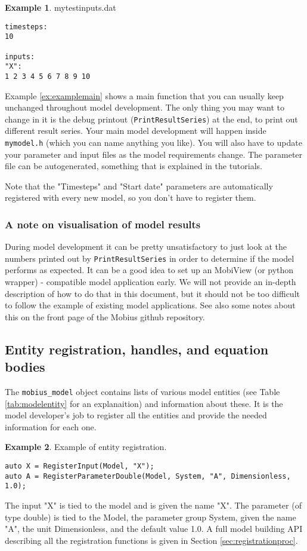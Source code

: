 \documentclass[11pt]{article}
\theoremstyle{definition}
\newtheorem{myexample}{Example}
\newenvironment{example}%
  {\begin{lrbox}{\examplebox}%
   \begin{minipage}{\dimexpr\linewidth-2\fboxsep}
   \begin{myexample}}%
  {\end{myexample}%
   \end{minipage}%
   \end{lrbox}%
   \begin{trivlist}
     \item[]\colorbox{silver}{\usebox\examplebox}
   \end{trivlist}}
\begin{document}
\begin{example}
mytestinputs.dat
\begin{lstlisting}[style=textstyle]
timesteps:
10

inputs:
"X":
1 2 3 4 5 6 7 8 9 10
\end{lstlisting}
\end{example}

Example \ref{ex:examplemain} shows a main function that you can usually keep unchanged throughout model development. The only thing you may want to change in it is the debug printout ({\tt PrintResultSeries}) at the end, to print out different result series. Your main model development will happen inside {\tt mymodel.h} (which you can name anything you like). You will also have to update your parameter and input files as the model requirements change. The parameter file can be autogenerated, something that is explained in the tutorials.

Note that the "Timesteps" and "Start date" parameters are automatically registered with every new model, so you don't have to register them.

\subsubsection{A note on visualisation of model results}

During model development it can be pretty unsatisfactory to just look at the numbers printed out by {\tt PrintResultSeries} in order to determine if the model performs as expected. It can be a good idea to set up an MobiView (or python wrapper) - compatible model application early. We will not provide an in-depth description of how to do that in this document, but it should not be too difficult to follow the example of existing model applications. See also some notes about this on the front page of the Mobius github repository.

\subsection{Entity registration, handles, and equation bodies}\label{sec:registrationandhandles}

The {\tt mobius\_model} object contains lists of various model entities (see Table \ref{tab:modelentity} for an explanaition) and information about these. It is the model developer's job to register all the entities and provide the needed information for each one.

\begin{example}\label{ex:registration}
Example of entity registration.
\begin{lstlisting}[style=mycpp]
auto X = RegisterInput(Model, "X");
auto A = RegisterParameterDouble(Model, System, "A", Dimensionless, 1.0);
\end{lstlisting}
The input "X" is tied to the model and is given the name "X". The parameter (of type double) is tied to the Model, the parameter group System, given the name "A", the unit Dimensionless, and the default value 1.0. A full model building API describing all the registration functions is given in Section \ref{sec:registrationproc}.
\end{example}
\end{document}
